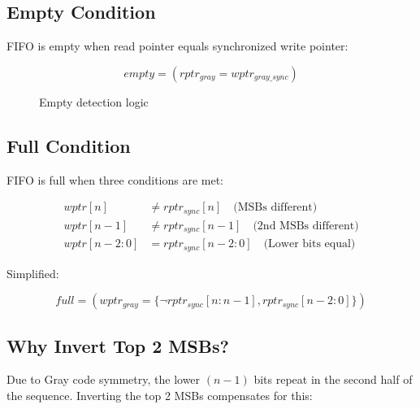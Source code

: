 \documentclass[12pt,a4paper]{article}
\begin{document}
\subsection{Empty Condition}

FIFO is empty when read pointer equals synchronized write pointer:

\begin{equation}
\boxed{empty = (rptr_{gray} = wptr_{gray\_sync})}
\end{equation}

\begin{figure}[h]
\centering
{}
\caption{Empty detection logic}
\end{figure}

\subsection{Full Condition}

FIFO is full when three conditions are met:

\begin{align}
wptr[n] &\neq rptr_{sync}[n] \quad \text{(MSBs different)} \\
wptr[n-1] &\neq rptr_{sync}[n-1] \quad \text{(2nd MSBs different)} \\
wptr[n-2:0] &= rptr_{sync}[n-2:0] \quad \text{(Lower bits equal)}
\end{align}

Simplified:

\begin{equation}
\boxed{full = (wptr_{gray} = \{\neg rptr_{sync}[n:n-1], rptr_{sync}[n-2:0]\})}
\end{equation}

\subsection{Why Invert Top 2 MSBs?}

Due to Gray code symmetry, the lower $(n-1)$ bits repeat in the second half of the sequence. Inverting the top 2 MSBs compensates for this:
\end{document}
